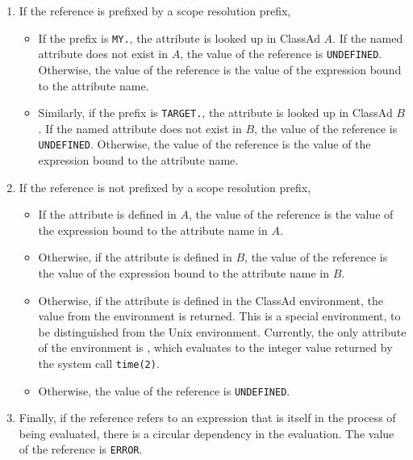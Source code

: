 \begin{enumerate}
    \item If the reference is prefixed by a scope resolution prefix, 
    \begin{itemize}
        \item If the prefix is \texttt{MY.}, the attribute is looked up in 
        ClassAd $A$.  If the named attribute does not exist in $A$, the
        value of the reference is \texttt{UNDEFINED}.  Otherwise, the
        value of the reference is the value of the expression bound to
        the attribute name.

        \item Similarly, if the prefix is \texttt{TARGET.}, the attribute is 
        looked up in ClassAd $B$.  If the named attribute does not exist in 
        $B$, the value of the reference is \texttt{UNDEFINED}.  Otherwise, 
        the value of the reference is the value of the expression bound to
        the attribute name.

    \end{itemize}

    \item If the reference is not prefixed by a scope resolution prefix,
    \begin{itemize}
        \item If the attribute is defined in $A$, the value of the reference
        is the value of the expression bound to the attribute name in $A$.
        \item Otherwise, if the attribute is defined in $B$, the value of the
        reference is the value of the expression bound to the attribute
        name in $B$.
        \item Otherwise, if the attribute is defined in the ClassAd environment, the
        value from the environment is returned.
        This is a special environment, to be
        distinguished from the Unix environment.
        Currently, the only attribute
        of the environment is , which evaluates to the
        integer value returned by the system call \texttt{time(2)}.
        \item Otherwise, the value of the reference is \texttt{UNDEFINED}.
    \end{itemize}

    \item Finally, if the reference refers to an expression that is itself in 
    the process of being evaluated, there is a circular dependency in the 
    evaluation.  The value of the reference is \texttt{ERROR}.
\end{enumerate}

